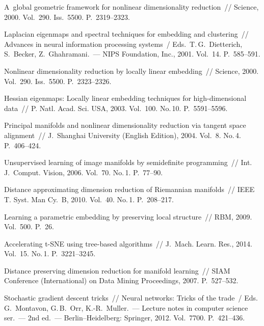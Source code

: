 \begin{multicols}{2}
{{\begin{thebibliography}{99}
  A~global geometric framework for nonlinear dimensionality reduction~// 
  Science, 2000. Vol.~290. Iss.~5500. P.~2319--2323.

  Laplacian eigenmaps and spectral techniques for embedding and clustering~// 
  Advances in neural information processing systems~/
  Eds.\ T.\,G.~Dietterich, S.~Becker, Z.~Ghahramani.~---
  NIPS Foundation, Inc., 2001. Vol.~14. P.~585--591.

  Nonlinear dimensionality reduction by locally linear embedding~// 
  Science, 2000. Vol.~290. Iss.~5500. P.~2323--2326.

  Hessian eigenmaps: Locally linear embedding techniques for high-dimensional data~// 
  P. Natl. Acad. Sci. USA, 2003. Vol.~100. No.\,10. P.~5591--5596.

   Principal manifolds and nonlinear dimensionality reduction
   via tangent space alignment~// J.~Shanghai University (English Edition), 2004. 
   Vol.~8. No.\,4. P.~406--424.

  Unsupervised learning of image manifolds by semidefinite programming~// 
  Int. J.~Comput. Vision, 2006. Vol.~70. No.\,1. P.~77--90.

  Distance approximating dimension reduction of Riemannian manifolds~// 
  IEEE T. Syst. Man Cy.~B, 2010. Vol.~40. No.\,1. 
  P.~208--217.

Learning a parametric embedding by preserving local structure~// 
RBM, 2009. Vol.~500. P.~26.

   Accelerating t-SNE using tree-based algorithms~// 
  J.~Mach. Learn. Res., 2014. Vol.~15. No.\,1. P.~3221--3245.

  Distance preserving dimension reduction for manifold learning~// 
  SIAM  Conference (International) on Data Mining Proceedings, 2007. P.~527--532.

  Stochastic gradient descent tricks~// Neural networks: Tricks of the trade~/ 
Eds. G.~Montavon, G.\,B.~Orr, K.-R.~Muller.~--- 
Lecture notes in computer science ser.~--- 2nd ed.~--- Berlin--Heidelberg: 
Springer, 2012. Vol.~7700. P.~421--436.


\end{thebibliography}}}
\end{multicols}

